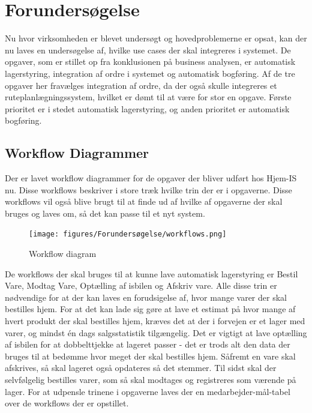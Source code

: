 \chapter{Forundersøgelse}\label{ch:forundersoegelse}
Nu hvor virksomheden er blevet undersøgt og hovedproblemerne er opsat, kan der nu laves en undersøgelse af, hvilke use cases der skal integreres i systemet. De opgaver, som er stillet op fra konklusionen på business analysen, er automatisk lagerstyring, integration af ordre i systemet og automatisk bogføring. Af de tre opgaver her fravælges integration af ordre, da der også skulle integreres et ruteplanlægningssystem, hvilket er dømt til at være for stor en opgave. Første prioritet er i stedet automatisk lagerstyring, og anden prioritet er automatisk bogføring.

\section{Workflow Diagrammer}
Der er lavet workflow diagrammer for de opgaver der bliver udført hos Hjem-IS nu. Disse workflows beskriver i store træk hvilke trin der er i opgaverne. Disse workflows vil også blive brugt til at finde ud af hvilke af opgaverne der skal bruges og laves om, så det kan passe til et nyt system. 

\begin{figure}[H]
    \centering
    \texttt{[image: figures/Forundersøgelse/workflows.png]}
    \caption{Workflow diagram}
    \label{fig:workflows}
\end{figure}
De workflows der skal bruges til at kunne lave automatisk lagerstyring er Bestil Vare, Modtag Vare, Optælling af isbilen og Afskriv vare. Alle disse trin er nødvendige for at der kan laves en forudsigelse af, hvor mange varer der skal bestilles hjem. For at det kan lade sig gøre at lave et estimat på hvor mange af hvert produkt der skal bestilles hjem, kræves det at der i forvejen er et lager med varer, og mindst én dags salgsstatistik tilgængelig. Det er vigtigt at lave optælling af isbilen for at dobbelttjekke at lageret passer - det er trods alt den data der bruges til at bedømme hvor meget der skal bestilles hjem. Såfremt en vare skal afskrives, så skal lageret også opdateres så det stemmer. Til sidst skal der selvfølgelig bestilles varer, som så skal modtages og registreres som værende på lager. For at udpensle trinene i opgaverne laves der en medarbejder-mål-tabel over de workflows der er opstillet.

